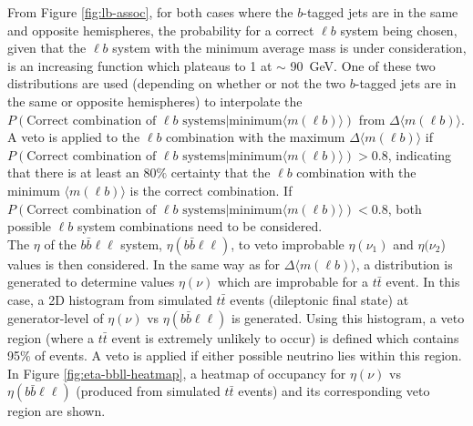 From Figure \ref{fig:lb-assoc}, for both cases where the $b$-tagged jets are in the same and opposite hemispheres, the probability for a correct $\ell b$ system being chosen, given that the $\ell b$ system with the minimum average mass is under consideration, is an increasing function which plateaus to 1 at $\sim$ \SI{90}{\GeV}. One of these two distributions are used (depending on whether or not the two $b$-tagged jets are in the same or opposite hemispheres) to interpolate the $P(\text{Correct combination of } \ell b \text{ systems} | \text{minimum} \langle m(\ell b) \rangle)$ from $\Delta \langle m(\ell b) \rangle$. A veto is applied to the $\ell b$ combination with the maximum $\Delta \langle m(\ell b) \rangle$ if $P(\text{Correct combination of } \ell b \text{ systems} | \text{minimum} \langle m(\ell b) \rangle) > 0.8$, indicating that there is at least an 80$\%$ certainty that the $\ell b$ combination with the minimum $\langle m(\ell b) \rangle$ is the correct combination. If $P(\text{Correct combination of } \ell b \text{ systems} | \text{minimum} \langle m(\ell b) \rangle) < 0.8$, both possible $\ell b$ system combinations need to be considered.\\

The $\eta$ of the $b\bar{b}\ell\ell$ system, $\eta(b\bar{b}\ell\ell)$, to veto improbable $\eta(\nu_{1})$ and $\eta(\nu_{2}$) values is then considered. In the same way as for $\Delta \langle m(\ell b)\rangle$, a distribution is generated to determine values $\eta(\nu)$ which are improbable for a $t\bar{t}$ event. In this case, a 2D histogram from simulated $t\bar{t}$ events (dileptonic final state) at generator-level of $\eta (\nu)$ vs $\eta(b\bar{b}\ell\ell)$ is generated. Using this histogram, a veto region (where a $t\bar{t}$ event is extremely unlikely to occur) is defined which contains 95$\%$ of events. A veto is applied if either possible neutrino lies within this region. In Figure \ref{fig:eta-bbll-heatmap}, a heatmap of occupancy for $\eta (\nu)$ vs $\eta(b\bar{b}\ell\ell)$ (produced from simulated $t\bar{t}$ events)  and its corresponding veto region are shown. 

